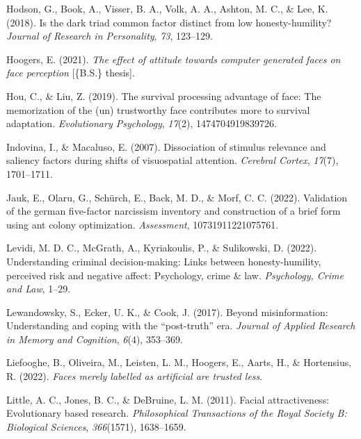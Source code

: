 \documentclass[
  man,floatsintext]{apa6}
\newlength{\cslhangindent}
\newlength{\cslentryspacingunit} %
\newenvironment{CSLReferences}[2] %
 {%
  \setlength{\parindent}{0pt}
  \ifodd #1
  \let\oldpar\par
  \def\par{\hangindent=\cslhangindent\oldpar}
  \fi
  \setlength{\parskip}{#2\cslentryspacingunit}
 }%
 {}
\begin{document}
\begin{CSLReferences}{1}{0}
\leavevmode{}%
Hodson, G., Book, A., Visser, B. A., Volk, A. A., Ashton, M. C., \& Lee, K. (2018). Is the dark triad common factor distinct from low honesty-humility? \emph{Journal of Research in Personality}, \emph{73}, 123--129.

\leavevmode{}%
Hoogers, E. (2021). \emph{The effect of attitude towards computer generated faces on face perception} {[}\{B.S.\} thesis{]}.

\leavevmode{}%
Hou, C., \& Liu, Z. (2019). The survival processing advantage of face: The memorization of the (un) trustworthy face contributes more to survival adaptation. \emph{Evolutionary Psychology}, \emph{17}(2), 1474704919839726.

\leavevmode{}%
Indovina, I., \& Macaluso, E. (2007). Dissociation of stimulus relevance and saliency factors during shifts of visuospatial attention. \emph{Cerebral Cortex}, \emph{17}(7), 1701--1711.

\leavevmode{}%
Jauk, E., Olaru, G., Schürch, E., Back, M. D., \& Morf, C. C. (2022). Validation of the german five-factor narcissism inventory and construction of a brief form using ant colony optimization. \emph{Assessment}, 10731911221075761.

\leavevmode{}%
Levidi, M. D. C., McGrath, A., Kyriakoulis, P., \& Sulikowski, D. (2022). Understanding criminal decision-making: Links between honesty-humility, perceived risk and negative affect: Psychology, crime \& law. \emph{Psychology, Crime and Law}, 1--29.

\leavevmode{}%
Lewandowsky, S., Ecker, U. K., \& Cook, J. (2017). Beyond misinformation: Understanding and coping with the {``post-truth''} era. \emph{Journal of Applied Research in Memory and Cognition}, \emph{6}(4), 353--369.

\leavevmode{}%
Liefooghe, B., Oliveira, M., Leisten, L. M., Hoogers, E., Aarts, H., \& Hortensius, R. (2022). \emph{Faces merely labelled as artificial are trusted less}.

\leavevmode{}%
Little, A. C., Jones, B. C., \& DeBruine, L. M. (2011). Facial attractiveness: Evolutionary based research. \emph{Philosophical Transactions of the Royal Society B: Biological Sciences}, \emph{366}(1571), 1638--1659.


\end{CSLReferences}
\end{document}
